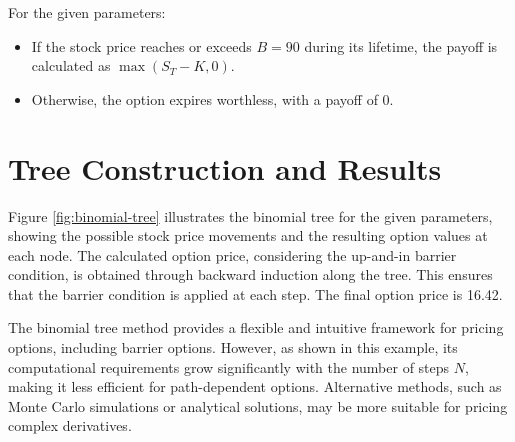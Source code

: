 For the given parameters:
\begin{itemize}
    \item If the stock price reaches or exceeds \(B = 90\) during its lifetime, the payoff is calculated as \(\max(S_T - K, 0)\).
    \item Otherwise, the option expires worthless, with a payoff of 0.
\end{itemize}

\section{Tree Construction and Results}

Figure \ref{fig:binomial-tree} illustrates the binomial tree for the given parameters, showing the possible stock price movements and the resulting option values at each node. The calculated option price, considering the up-and-in barrier condition, is obtained through backward induction along the tree. This ensures that the barrier condition is applied at each step. The final option price is 16.42.



The binomial tree method provides a flexible and intuitive framework for pricing options, including barrier options. However, as shown in this example, its computational requirements grow significantly with the number of steps \(N\), making it less efficient for path-dependent options. Alternative methods, such as Monte Carlo simulations or analytical solutions, may be more suitable for pricing complex derivatives.
